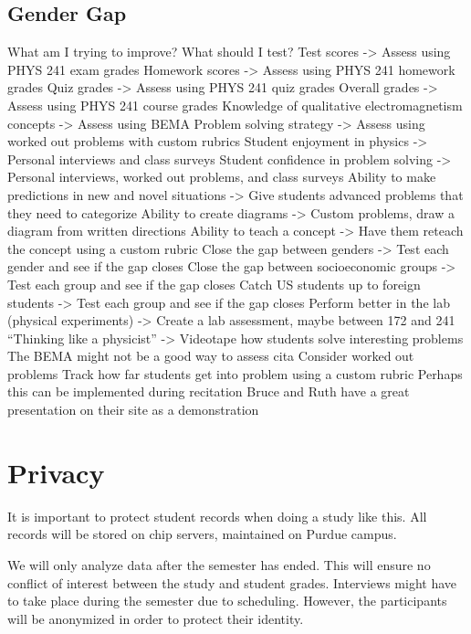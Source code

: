 \subsection{Gender Gap}

What am I trying to improve? What should I test?
Test scores -> Assess using PHYS 241 exam grades
Homework scores -> Assess using PHYS 241 homework grades
Quiz grades -> Assess using PHYS 241 quiz grades
Overall grades -> Assess using PHYS 241 course grades
Knowledge of qualitative electromagnetism concepts -> Assess using BEMA
Problem solving strategy -> Assess using worked out problems with custom rubrics
Student enjoyment in physics -> Personal interviews and class surveys
Student confidence in problem solving -> Personal interviews, worked out problems, and class surveys
Ability to make predictions in new and novel situations -> Give students advanced problems that they need to categorize
Ability to create diagrams -> Custom problems, draw a diagram from written directions
Ability to teach a concept -> Have them reteach the concept using a custom rubric
Close the gap between genders -> Test each gender and see if the gap closes
Close the gap between socioeconomic groups -> Test each group and see if the gap closes
Catch US students up to foreign students -> Test each group and see if the gap closes
Perform better in the lab (physical experiments) -> Create a lab assessment, maybe between 172 and 241
“Thinking like a physicist” -> Videotape how students solve interesting problems
The BEMA might not be a good way to assess \gls{cita}
Consider worked out problems
Track how far students get into problem using a custom rubric
Perhaps this can be implemented during recitation
Bruce and Ruth have a great presentation on their site as a demonstration



\section{Privacy}

It is important to protect student records when doing a study like this. All records will be stored on \gls{chip} servers, maintained on Purdue campus.

We will only analyze data after the semester has ended. This will ensure no conflict of interest between the study and student grades. Interviews might have to take place during the semester due to scheduling. However, the participants will be anonymized in order to protect their identity.

